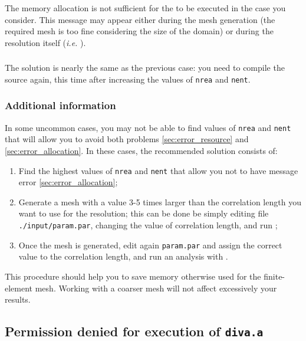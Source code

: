 The memory allocation is not sufficient for the \diva to be executed in the case you consider. This message may appear either during the mesh generation (the required mesh is too fine considering the size of the domain) or during the resolution itself (\textit{i.e.} ).

\subsubsection{\answer}

The solution is nearly the same as the previous case: you need to compile the source again, this time after increasing the values of \texttt{nrea} and \texttt{nent}.

\subsubsection[Additional information]{Additional information \expert}

In some uncommon cases, you may not be able to find values of \texttt{nrea} and \texttt{nent} that will allow you to avoid both problems \ref{sec:error_resource} and \ref{sec:error_allocation}. In these cases, the recommended solution consists of:
\begin{enumerate}
\item Find the highest values of \texttt{nrea} and \texttt{nent} that allow you not to have message error \ref{sec:error_allocation};
\item Generate a mesh with a value 3-5 times larger than the correlation length you want to use for the resolution; this can be done be simply editing file \texttt{./input/param.par}, changing the value of correlation length, and run ;
\item Once the mesh is generated, edit again \texttt{param.par} and assign the correct value to the correlation length, and run an analysis with .
\end{enumerate}

This procedure should help you to save memory otherwise used for the finite-element mesh. Working with a coarser mesh will not affect excessively your results.





\subsection{Permission denied for execution of \texttt{diva.a}\label{sec:error_gfortran}}


